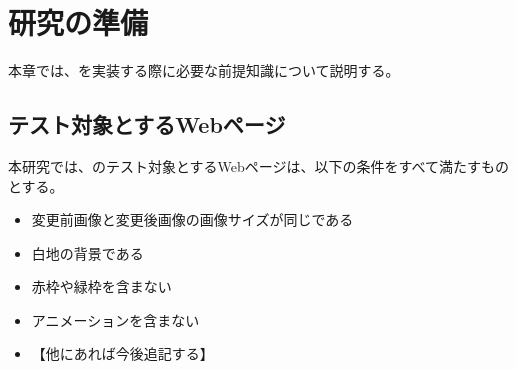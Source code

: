 \chapter{研究の準備}\label{cha:Preparation}
本章では、\toolName を実装する際に必要な前提知識について説明する。

\section{テスト対象とするWebページ}\label{sec:target_images}
本研究では、\toolName のテスト対象とするWebページは、以下の条件をすべて満たすものとする。
\begin{itemize}
      \setlength{\itemsep}{0pt}
            \setlength{\parsep}{0pt}
      \item 変更前画像と変更後画像の画像サイズが同じである
      \item 白地の背景である
      \item 赤枠や緑枠を含まない
      \item アニメーションを含まない
      \item 【他にあれば今後追記する】
\end{itemize}


